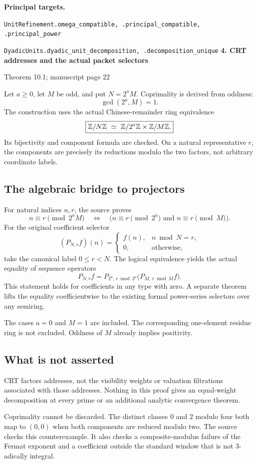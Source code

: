 \documentclass[11pt]{article}
\newcommand{\target}[1]{{\footnotesize\texttt{#1}}}
\newcommand{\pageheading}[2]{{\Large\bfseries\color{ink}#1}\par{\small #2}\par\medskip}
\begin{document}
\textbf{Principal targets.}\par
\target{UnitRefinement.omega\_compatible, .principal\_compatible, .principal\_power}\par
\target{DyadicUnits.dyadic\_unit\_decomposition, .decomposition\_unique}
\newpage
\pageheading{4. CRT addresses and the actual packet selectors}{Theorem 10.1; manuscript page 22}
Let $a\geq0$, let $M$ be odd, and put $N=2^aM$. Coprimality is derived from oddness:
\[
 \gcd(2^a,M)=1.
\]
The construction uses the actual Chinese-remainder ring equivalence
\[
 \boxed{\Z/N\Z\ \simeq\ \Z/2^a\Z\times\Z/M\Z.}
\]
Its bijectivity and component formula are checked. On a natural representative $r$, the components are precisely its reductions modulo the two factors, not arbitrary coordinate labels.

\subsection*{The algebraic bridge to projectors}
For natural indices $n,r$, the source proves
\[
 n\equiv r\pmod{2^aM}
 \quad\Longleftrightarrow\quad
 \bigl(n\equiv r\pmod{2^a}\text{ and }n\equiv r\pmod M\bigr).
\]
For the original coefficient selector
\[
 (P_{N,r}f)(n)=
 \begin{cases}f(n),&n\bmod N=r,\\0,&\text{otherwise},\end{cases}
\]
take the canonical label $0\leq r<N$. The logical equivalence yields the actual equality of sequence operators
\[
 \boxed{P_{N,r}f=
 P_{2^a,\,r\bmod2^a}\bigl(P_{M,\,r\bmod M}f\bigr).}
\]
This statement holds for coefficients in any type with zero. A separate theorem lifts the equality coefficientwise to the existing formal power-series selectors over any semiring.

The cases $a=0$ and $M=1$ are included. The corresponding one-element residue ring is not excluded. Oddness of $M$ already implies positivity.

\subsection*{What is not asserted}
CRT factors addresses, not the visibility weights or valuation filtrations associated with those addresses. Nothing in this proof gives an equal-weight decomposition at every prime or an additional analytic convergence theorem.

Coprimality cannot be discarded. The distinct classes $0$ and $2$ modulo four both map to $(0,0)$ when both components are reduced modulo two. The source checks this counterexample. It also checks a composite-modulus failure of the Fermat exponent and a coefficient outside the standard window that is not $3$-adically integral.
\end{document}
